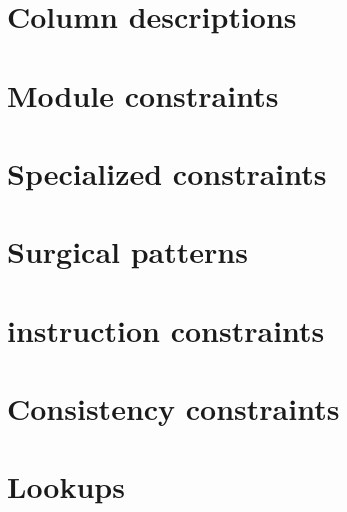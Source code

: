 

\section{Column descriptions}                 \label{mmio: columnms}                
\section{Module constraints}                  \label{mmio: generalities}            
\section{Specialized constraints}             \label{mmio: specialized constraints} 
\section{Surgical patterns}                   \label{mmio: surgical patterns}       
\section{\mmioMod{} instruction constraints}  \label{mmio: instructions}            
\section{Consistency constraints}             \label{mmio: consistencies}           
\section{Lookups}                             \label{mmio: lookups}                 
